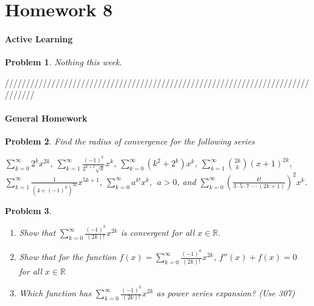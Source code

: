 \documentclass[11pt,oneside]{article}
\newtheorem{prob}{Problem}
\begin{document}


\section*{Homework 8} 
\paragraph{Active Learning}

\begin{prob}
	Nothing this week.
\end{prob}

///////////////////////////////////////////////////////////////////////////////

\paragraph{General Homework}

\begin{prob}
Find the radius of convergence for the following series

	 $\sum_{k=0}^{\infty}2^kx^{2k}$, $\sum_{k=1}^{\infty}\frac{(-1)^k}{2^{k+1}\sqrt k}x^k$,  
	 $\sum_{k=0}^{\infty}(k^2+2^k)x^k$, $\sum_{k=1}^{\infty}{2k\choose k}(x+1)^{2k}$,
	 $\sum_{k=1}^{\infty}\frac{1}{(4+(-1)^k)^{3k}}x^{5k+1}$, $\sum_{k=0}^{\infty}a^{k!}x^k, \:\:a>0$, and
	 $\sum_{k=0}^{\infty}\left(\frac{k!}{3\cdot5\cdot7\cdot\cdot\cdot(2k+1)}\right)^2x^k$.

\end{prob}

\begin{prob}
	\begin{enumerate}
		\item Show that $\sum_{k=0}^{\infty}\frac{(-1)^k}{(2k)!}x^{2k}$ is convergent for all $x\in\mathbb R$.
		\item Show that for the function $f(x)=\sum_{k=0}^{\infty}\frac{(-1)^k}{(2k)!}x^{2k} $, $f''(x)+f(x)=0$ for
			 all $x\in\mathbb R$ 
		\item Which function has $\sum_{k=0}^{\infty}\frac{(-1)^k}{(2k)!}x^{2k}$ as power series expansion? (Use 307)
	\end{enumerate}
\end{prob}
\end{document}
